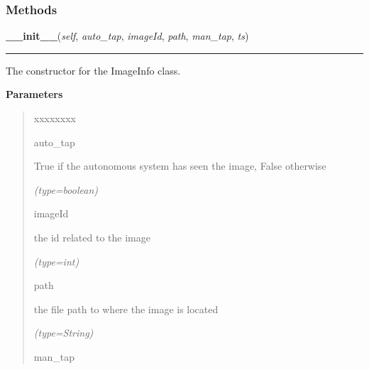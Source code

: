 
  \subsubsection{Methods}

    \label{client_rest:ImageInfo:__init__}

    \vspace{0.5ex}

\hspace{.8\funcindent}\begin{boxedminipage}{\funcwidth}

    \raggedright \textbf{\_\_init\_\_}(\textit{self}, \textit{auto\_tap}, \textit{imageId}, \textit{path}, \textit{man\_tap}, \textit{ts})

    \vspace{-1.5ex}

    \rule{\textwidth}{0.5\fboxrule}
\setlength{\parskip}{2ex}
    The constructor for the ImageInfo class.

\setlength{\parskip}{1ex}
      \textbf{Parameters}
      \vspace{-1ex}

      \begin{quote}
        \begin{Ventry}{xxxxxxxx}

          \item[auto\_tap]

          True if the autonomous system has seen the image, False otherwise

            {\it (type=boolean)}

          \item[imageId]

          the id related to the image

            {\it (type=int)}

          \item[path]

          the file path to where the image is located

            {\it (type=String)}

          \item[man\_tap]


\end{Ventry}
\end{quote}
\end{boxedminipage}
